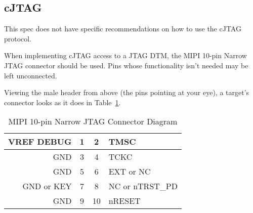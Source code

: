 \subsection{cJTAG}

This spec does not have specific recommendations on how to use the cJTAG
protocol.

When implementing cJTAG access to a JTAG DTM, the MIPI 10-pin Narrow JTAG
connector should be used. Pins whose functionality isn't needed may be left
unconnected.

Viewing the male header from above (the pins pointing
at your eye), a target's connector looks as it does in
Table~\ref{tab:mipicjtag}.

\begin{table}[htp]
    \centering
    \caption{MIPI 10-pin Narrow JTAG Connector Diagram}
    \label{tab:mipicjtag}
    \begin{tabular}{|r|c|c|l|}
        \hline
        VREF DEBUG & 1 & 2 & TMSC \\
        \hline
        GND & 3 & 4 & TCKC \\
        \hline
        GND & 5 & 6 & EXT or NC \\
        \hline
        GND or KEY & 7 & 8 & NC or nTRST\_PD \\
        \hline
        GND & 9 & 10 & nRESET \\
        \hline
    \end{tabular}
\end{table}
